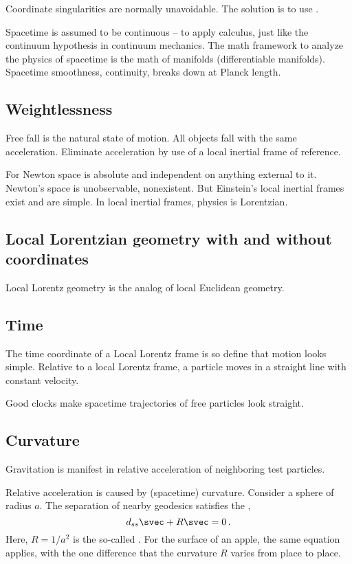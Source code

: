 Coordinate singularities are normally unavoidable. The solution is to use .

Spacetime is assumed to be continuous -- to apply calculus, just like the continuum hypothesis in continuum mechanics. The math framework to analyze the physics of spacetime is the math of manifolds (differentiable manifolds). Spacetime smoothness, continuity, breaks down at Planck length.


\subsection{Weightlessness}

Free fall is the natural state of motion. All objects fall with the same acceleration. Eliminate acceleration by use of a local inertial frame of reference.

For Newton space is absolute and independent on anything external to it. Newton's space is unobservable, nonexistent. But Einstein's local inertial frames exist and are simple. In local inertial frames, physics is Lorentzian.


\subsection{Local Lorentzian geometry with and without coordinates}

Local Lorentz geometry is the analog of local Euclidean geometry.


\subsection{Time}

The time coordinate of a Local Lorentz frame is so define that motion looks simple. Relative to a local Lorentz frame, a particle moves in a straight line with constant velocity.

Good clocks make spacetime trajectories of free particles look straight.


\subsection{Curvature}

Gravitation is manifest in relative acceleration of neighboring test particles. 

Relative acceleration is caused by (spacetime) curvature. Consider a sphere of radius $a$. The separation of nearby geodesics satisfies the ,
%
\begin{equation}\label{eq:geodesicdeviationsphere}
  d_{ss}\svec + R\svec = 0\,.
\end{equation}
%
Here, $R = 1/a^2$ is the so-called . For the surface of an apple, the same equation applies, with the one difference that the curvature $R$ varies from place to place.

